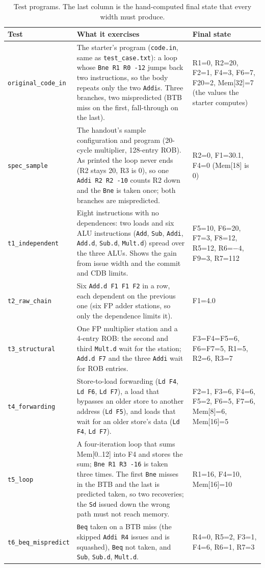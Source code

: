 \documentclass[11pt]{article}
\newcommand{\code}[1]{\texttt{#1}}
\begin{document}
\begin{table}[htbp]
\centering
\caption{Test programs. The last column is the hand-computed final state that every width must produce.}
\label{tab:tests}
\small
\begin{tabular}{@{}l>{\raggedright\arraybackslash}p{}>{\raggedright\arraybackslash}p{}@{}}
\toprule
Test & What it exercises & Final state \\
\midrule
\code{original\_code\_in} & The starter's program (\code{code.in}, same as \code{test\_case.txt}): a loop whose \code{Bne R1 R0 -12} jumps back two instructions, so the body repeats only the two \code{Addi}s. Three branches, two mispredicted (BTB miss on the first, fall-through on the last). & R1=0, R2=20, F2=1, F4=3, F6=7, F20=2, Mem[32]=7 (the values the starter computes) \\
\code{spec\_sample} & The handout's sample configuration and program (20-cycle multiplier, 128-entry ROB). As printed the loop never ends (R2 stays 20, R3 is 0), so one \code{Addi R2 R2 -10} counts R2 down and the \code{Bne} is taken once; both branches are mispredicted. & R2=0, F1=30.1, F4=0 (Mem[18] is 0) \\
\code{t1\_independent} & Eight instructions with no dependences: two loads and six ALU instructions (\code{Add}, \code{Sub}, \code{Addi}, \code{Add.d}, \code{Sub.d}, \code{Mult.d}) spread over the three ALUs. Shows the gain from issue width and the commit and CDB limits. & F5=10, F6=20, F7=3, F8=12, R5=12, R6=$-4$, F9=3, R7=112 \\
\code{t2\_raw\_chain} & Six \code{Add.d F1 F1 F2} in a row, each dependent on the previous one (six FP adder stations, so only the dependence limits it). & F1=4.0 \\
\code{t3\_structural} & One FP multiplier station and a 4-entry ROB: the second and third \code{Mult.d} wait for the station; \code{Add.d F7} and the three \code{Addi} wait for ROB entries. & F3=F4=F5=6, F6=F7=5, R1=5, R2=6, R3=7 \\
\code{t4\_forwarding} & Store-to-load forwarding (\code{Ld F4}, \code{Ld F6}, \code{Ld F7}), a load that bypasses an older store to another address (\code{Ld F5}), and loads that wait for an older store's data (\code{Ld F4}, \code{Ld F7}). & F2=1, F3=6, F4=6, F5=2, F6=5, F7=6, Mem[8]=6, Mem[16]=5 \\
\code{t5\_loop} & A four-iteration loop that sums Mem[0..12] into F4 and stores the sum; \code{Bne R1 R3 -16} is taken three times. The first \code{Bne} misses in the BTB and the last is predicted taken, so two recoveries; the \code{Sd} issued down the wrong path must not reach memory. & R1=16, F4=10, Mem[16]=10 \\
\code{t6\_beq\_mispredict} & \code{Beq} taken on a BTB miss (the skipped \code{Addi R4} issues and is squashed), \code{Beq} not taken, and \code{Sub}, \code{Sub.d}, \code{Mult.d}. & R4=0, R5=2, F3=1, F4=6, R6=1, R7=3 \\
\bottomrule
\end{tabular}
\end{table}
\end{document}
